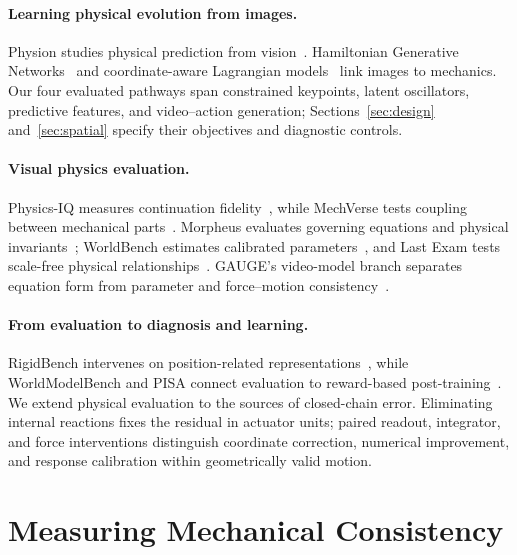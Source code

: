 \documentclass[10pt,twocolumn,letterpaper]{article}
\begin{document}
\paragraph{Learning physical evolution from images.}
Physion studies physical prediction from vision~\cite{bear2021physion}. Hamiltonian Generative Networks~\cite{toth2020hgn} and coordinate-aware Lagrangian models~\cite{zhong2020images} link images to mechanics. Our four evaluated pathways span constrained keypoints, latent oscillators, predictive features, and video--action generation; Sections~\ref{sec:design} and~\ref{sec:spatial} specify their objectives and diagnostic controls.

\paragraph{Visual physics evaluation.}
Physics-IQ measures continuation fidelity~\cite{motamed2026physicsiq}, while MechVerse tests coupling between mechanical parts~\cite{jain2026mechverse}. Morpheus evaluates governing equations and physical invariants~\cite{tragoudaras2026morpheus}; WorldBench estimates calibrated parameters~\cite{upadhyay2026worldbench}, and Last Exam tests scale-free physical relationships~\cite{gao2026lastexam}. GAUGE's video-model branch separates equation form from parameter and force--motion consistency~\cite{wang2026gauge}.

\paragraph{From evaluation to diagnosis and learning.}
RigidBench intervenes on position-related representations~\cite{jain2026rigidbench}, while WorldModelBench and PISA connect evaluation to reward-based post-training~\cite{li2025worldmodelbench,li2025pisa}. We extend physical evaluation to the sources of closed-chain error. Eliminating internal reactions fixes the residual in actuator units; paired readout, integrator, and force interventions distinguish coordinate correction, numerical improvement, and response calibration within geometrically valid motion.

\section{Measuring Mechanical Consistency}
\label{sec:audit}
\end{document}
